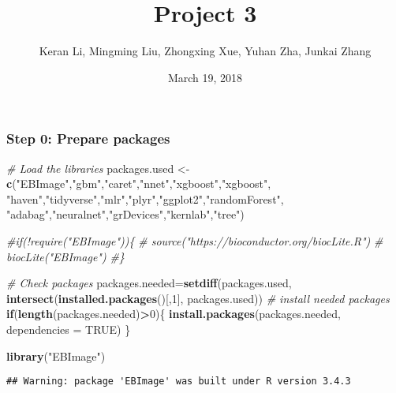 \documentclass[]{article}
\title{Project 3}
\author{Keran Li, Mingming Liu, Zhongxing Xue, Yuhan Zha, Junkai Zhang}
\date{March 19, 2018}
\newenvironment{Shaded}{\begin{snugshade}}{\end{snugshade}}
\newcommand{\KeywordTok}[1]{\textcolor[rgb]{0.13,0.29,0.53}{\textbf{#1}}}
\newcommand{\DataTypeTok}[1]{\textcolor[rgb]{0.13,0.29,0.53}{#1}}
\newcommand{\DecValTok}[1]{\textcolor[rgb]{0.00,0.00,0.81}{#1}}
\newcommand{\StringTok}[1]{\textcolor[rgb]{0.31,0.60,0.02}{#1}}
\newcommand{\CommentTok}[1]{\textcolor[rgb]{0.56,0.35,0.01}{\textit{#1}}}
\newcommand{\OtherTok}[1]{\textcolor[rgb]{0.56,0.35,0.01}{#1}}
\newcommand{\ControlFlowTok}[1]{\textcolor[rgb]{0.13,0.29,0.53}{\textbf{#1}}}
\newcommand{\OperatorTok}[1]{\textcolor[rgb]{0.81,0.36,0.00}{\textbf{#1}}}
\newcommand{\NormalTok}[1]{#1}
\begin{document}
\maketitle

\subsubsection{Step 0: Prepare packages}\label{step-0-prepare-packages}

\begin{Shaded}
\begin{Highlighting}[]
\CommentTok{# Load the libraries}
\NormalTok{packages.used <-}\StringTok{ }\KeywordTok{c}\NormalTok{(}\StringTok{"EBImage"}\NormalTok{,}\StringTok{"gbm"}\NormalTok{,}\StringTok{"caret"}\NormalTok{,}\StringTok{"nnet"}\NormalTok{,}\StringTok{"xgboost"}\NormalTok{,}\StringTok{"xgboost"}\NormalTok{,}
                   \StringTok{"haven"}\NormalTok{,}\StringTok{"tidyverse"}\NormalTok{,}\StringTok{"mlr"}\NormalTok{,}\StringTok{"plyr"}\NormalTok{,}\StringTok{"ggplot2"}\NormalTok{,}\StringTok{"randomForest"}\NormalTok{,}
                   \StringTok{"adabag"}\NormalTok{,}\StringTok{"neuralnet"}\NormalTok{,}\StringTok{"grDevices"}\NormalTok{,}\StringTok{"kernlab"}\NormalTok{,}\StringTok{"tree"}\NormalTok{)}

\CommentTok{#if(!require("EBImage"))\{}
\CommentTok{#  source("https://bioconductor.org/biocLite.R")}
\CommentTok{#  biocLite("EBImage")}
\CommentTok{#\}}

\CommentTok{# Check packages}
\NormalTok{packages.needed=}\KeywordTok{setdiff}\NormalTok{(packages.used, }
                        \KeywordTok{intersect}\NormalTok{(}\KeywordTok{installed.packages}\NormalTok{()[,}\DecValTok{1}\NormalTok{], }
\NormalTok{                                  packages.used))}
\CommentTok{# install needed packages}
\ControlFlowTok{if}\NormalTok{(}\KeywordTok{length}\NormalTok{(packages.needed)}\OperatorTok{>}\DecValTok{0}\NormalTok{)\{}
  \KeywordTok{install.packages}\NormalTok{(packages.needed, }\DataTypeTok{dependencies =} \OtherTok{TRUE}\NormalTok{)}
\NormalTok{\}}

\KeywordTok{library}\NormalTok{(}\StringTok{"EBImage"}\NormalTok{)}
\end{Highlighting}
\end{Shaded}

\begin{verbatim}
## Warning: package 'EBImage' was built under R version 3.4.3
\end{verbatim}
\end{document}
